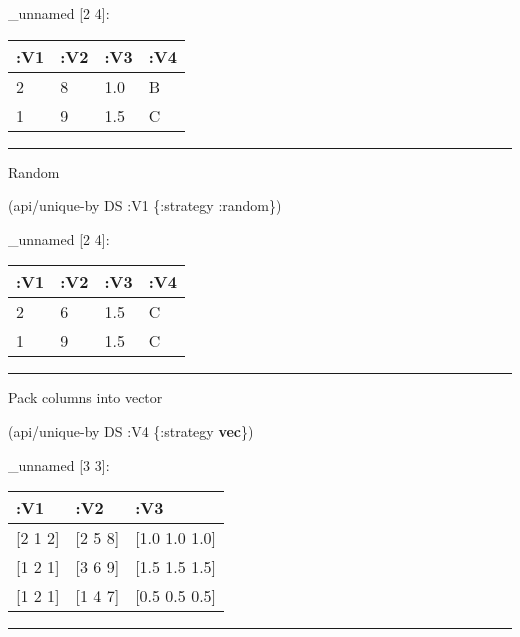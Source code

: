 \documentclass[]{article}
\newenvironment{Shaded}{\begin{snugshade}}{\end{snugshade}}
\newcommand{\AttributeTok}[1]{\textcolor[rgb]{0.77,0.63,0.00}{#1}}
\newcommand{\KeywordTok}[1]{\textcolor[rgb]{0.13,0.29,0.53}{\textbf{#1}}}
\newcommand{\NormalTok}[1]{#1}
\begin{document}
\_unnamed {[}2 4{]}:

\begin{longtable}[]{@{}llll@{}}
\toprule
:V1 & :V2 & :V3 & :V4\tabularnewline
\midrule
\endhead
2 & 8 & 1.0 & B\tabularnewline
1 & 9 & 1.5 & C\tabularnewline
\bottomrule
\end{longtable}

\begin{center}\rule{0.5\linewidth}{0.5pt}\end{center}

Random

\begin{Shaded}
\begin{Highlighting}[]
\NormalTok{(api/unique-by DS }\AttributeTok{:V1}\NormalTok{ \{}\AttributeTok{:strategy} \AttributeTok{:random}\NormalTok{\})}
\end{Highlighting}
\end{Shaded}

\_unnamed {[}2 4{]}:

\begin{longtable}[]{@{}llll@{}}
\toprule
:V1 & :V2 & :V3 & :V4\tabularnewline
\midrule
\endhead
2 & 6 & 1.5 & C\tabularnewline
1 & 9 & 1.5 & C\tabularnewline
\bottomrule
\end{longtable}

\begin{center}\rule{0.5\linewidth}{0.5pt}\end{center}

Pack columns into vector

\begin{Shaded}
\begin{Highlighting}[]
\NormalTok{(api/unique-by DS }\AttributeTok{:V4}\NormalTok{ \{}\AttributeTok{:strategy} \KeywordTok{vec}\NormalTok{\})}
\end{Highlighting}
\end{Shaded}

\_unnamed {[}3 3{]}:

\begin{longtable}[]{@{}lll@{}}
\toprule
:V1 & :V2 & :V3\tabularnewline
\midrule
\endhead
{[}2 1 2{]} & {[}2 5 8{]} & {[}1.0 1.0 1.0{]}\tabularnewline
{[}1 2 1{]} & {[}3 6 9{]} & {[}1.5 1.5 1.5{]}\tabularnewline
{[}1 2 1{]} & {[}1 4 7{]} & {[}0.5 0.5 0.5{]}\tabularnewline
\bottomrule
\end{longtable}

\begin{center}\rule{0.5\linewidth}{0.5pt}\end{center}
\end{document}
